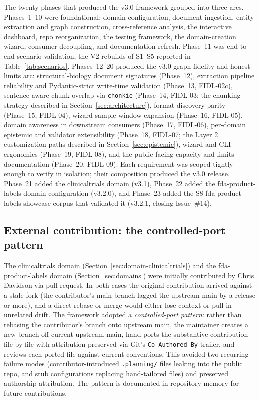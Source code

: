 The twenty phases that produced the v3.0 framework grouped into three arcs. Phases~1--10 were foundational: domain configuration, document ingestion, entity extraction and graph construction, cross-reference analysis, the interactive dashboard, repo reorganization, the testing framework, the domain-creation wizard, consumer decoupling, and documentation refresh. Phase~11 was end-to-end scenario validation, the V2 rebuilds of S1--S5 reported in Table~\ref{tab:scenarios}. Phases~12--20 produced the v3.0 graph-fidelity-and-honest-limits arc: structural-biology document signatures (Phase~12), extraction pipeline reliability and Pydantic-strict write-time validation (Phase~13, FIDL-02c), sentence-aware chunk overlap via \texttt{chonkie} (Phase~14, FIDL-03; the chunking strategy described in Section~\ref{sec:architecture}), format discovery parity (Phase~15, FIDL-04), wizard sample-window expansion (Phase~16, FIDL-05), domain awareness in downstream consumers (Phase~17, FIDL-06), per-domain epistemic and validator extensibility (Phase~18, FIDL-07; the Layer 2 customization paths described in Section~\ref{sec:epistemic}), wizard and CLI ergonomics (Phase~19, FIDL-08), and the public-facing capacity-and-limits documentation (Phase~20, FIDL-09). Each requirement was scoped tightly enough to verify in isolation; their composition produced the v3.0 release. Phase~21 added the clinicaltrials domain (v3.1), Phase~22 added the fda-product-labels domain configuration (v3.2.0), and Phase~23 added the S8 fda-product-labels showcase corpus that validated it (v3.2.1, closing Issue~\#14).

\subsection{External contribution: the controlled-port pattern}

The clinicaltrials domain (Section~\ref{sec:domain-clinicaltrials}) and the fda-product-labels domain (Section~\ref{sec:domains}) were initially contributed by Chris Davidson via pull request. In both cases the original contribution arrived against a stale fork (the contributor's main branch lagged the upstream main by a release or more), and a direct rebase or merge would either lose context or pull in unrelated drift. The framework adopted a \emph{controlled-port pattern}: rather than rebasing the contributor's branch onto upstream main, the maintainer creates a new branch off current upstream main, hand-ports the substantive contribution file-by-file with attribution preserved via Git's \texttt{Co-Authored-By} trailer, and reviews each ported file against current conventions. This avoided two recurring failure modes (contributor-introduced \texttt{.planning/} files leaking into the public repo, and stub configurations replacing hand-tailored files) and preserved authorship attribution. The pattern is documented in repository memory for future contributions.

